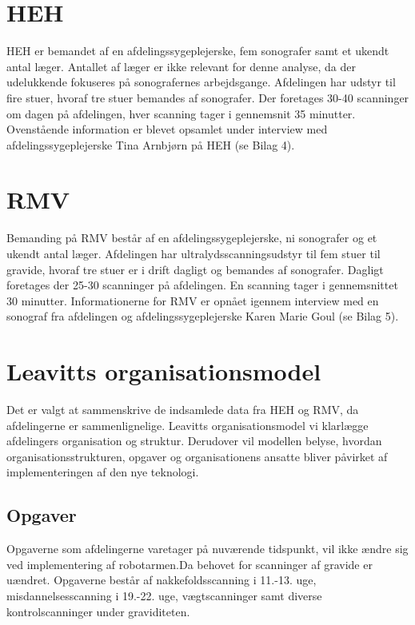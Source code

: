 \section{HEH}
HEH er bemandet af en afdelingssygeplejerske, fem sonografer samt et ukendt antal læger. Antallet af læger er ikke relevant for denne analyse, da der udelukkende fokuseres på sonografernes arbejdsgange.
Afdelingen har udstyr til fire stuer, hvoraf tre stuer bemandes af sonografer. Der foretages 30-40 scanninger om dagen på afdelingen, hver scanning tager i gennemsnit 35 minutter. 
Ovenstående information er blevet opsamlet under interview med afdelingssygeplejerske Tina Arnbjørn på HEH (se Bilag 4).

\section{RMV}
Bemanding på RMV består af en afdelingssygeplejerske, ni sonografer og et ukendt antal læger. Afdelingen har ultralydsscanningsudstyr til fem stuer til gravide, hvoraf tre stuer er i drift dagligt og bemandes af sonografer. Dagligt foretages der 25-30 scanninger på afdelingen. En scanning tager i gennemsnittet 30 minutter.
Informationerne for RMV er opnået igennem interview med en sonograf fra afdelingen og afdelingssygeplejerske Karen Marie Goul (se Bilag 5).

\section{Leavitts organisationsmodel}
Det er valgt at sammenskrive de indsamlede data fra HEH og RMV, da afdelingerne er sammenlignelige. Leavitts organisationsmodel vi klarlægge afdelingers organisation og struktur. Derudover vil modellen belyse, hvordan organisationsstrukturen, opgaver og organisationens ansatte bliver påvirket af implementeringen af den nye teknologi. \cite{Leavitt} \cite{diamantmodel} 


\subsection{Opgaver}
Opgaverne som afdelingerne varetager på nuværende tidspunkt, vil ikke ændre sig ved implementering af robotarmen.Da behovet for scanninger af gravide er uændret. Opgaverne består af nakkefoldsscanning i 11.-13. uge, misdannelsesscanning i 19.-22. uge, vægtscanninger samt diverse kontrolscanninger under graviditeten. \cite{graviditet} 

